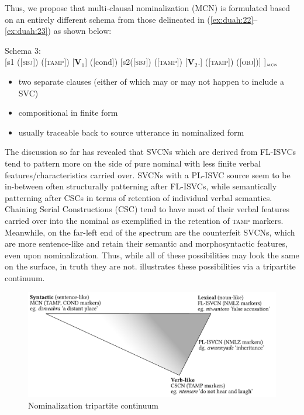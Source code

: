 \documentclass[output=paper,modfonts,nonflat,
colorlinks, citecolor=brown,
]{langsci/langscibook}
\begin{document}
Thus, we propose that multi-clausal nominalization (MCN) is formulated based on an entirely different schema from those delineated in (\ref{ex:duah:22}--\ref{ex:duah:23}) as shown below:

\ea
Schema 3:\\{}
[s1 ([\textsc{sbj}]) ([\textsc{tamp}]) [\textbf{V}$_1$] ([cond])	[s2([\textsc{sbj}]) ([\textsc{tamp}])
										[\textbf{V}$_2$.]	([\textsc{tamp}]) ([\textsc{obj}])] ]$_{\textsc{mcn}}$
\begin{itemize}
\item two separate clauses (either of which may or may not happen to include a SVC)
\item compositional in finite form
\item usually traceable back to source utterance in nominalized form
\end{itemize}
\z

The discussion so far has revealed that SVCNs which are derived from FL-ISVCs tend to pattern more on the side of pure nominal with less finite verbal features/characteristics carried over. SVCNs with a PL-ISVC source seem to be in-between often structurally patterning after FL-ISVCs, while semantically patterning after CSCs in terms of retention of individual verbal semantics. Chaining Serial Constructions (CSC) tend to have most of their verbal features carried over into the nominal as exemplified in the retention of \textsc{tamp} markers. Meanwhile, on the far-left end of the spectrum are the counterfeit SVCNs, which are more sentence-like and retain their semantic and morphosyntactic features, even upon nominalization. Thus, while all of these possibilities may look the same on the surface, in truth they are not.  illustrates these possibilities via a tripartite continuum.

\begin{figure}
\includegraphics[width=\textwidth]{fig-duah-2.pdf}
\caption{Nominalization tripartite continuum}
\label{fig:duah:4}
\end{figure}
\end{document}
